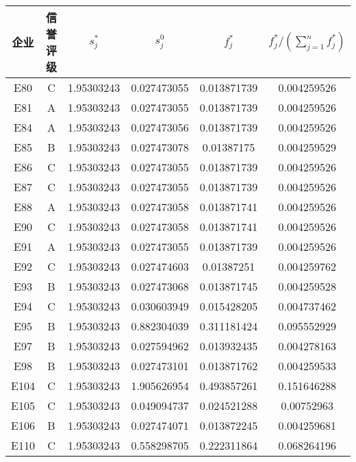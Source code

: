 \documentclass{cumcmthesis}
\begin{document}
\begin{appendices}
\begin{table}[H]   %
\centering
\begin{tabular}{cccccc}
\toprule[1.5pt]
企业& 信誉评级 & $s_j^*$ & $s_j^0$ & $f_j^*$ & $f_j^*/(\sum_{j=1}^n f_j^*)$ \\ 
\midrule[1pt]
E80 & C & 1.95303243 & 0.027473055 & 0.013871739 & 0.004259526 \\ 
E81 & A & 1.95303243 & 0.027473055 & 0.013871739 & 0.004259526 \\ 
E84 & A & 1.95303243 & 0.027473056 & 0.013871739 & 0.004259526 \\ 
E85 & B & 1.95303243 & 0.027473078 & 0.01387175 & 0.004259529 \\ 
E86 & C & 1.95303243 & 0.027473055 & 0.013871739 & 0.004259526 \\ 
E87 & C & 1.95303243 & 0.027473055 & 0.013871739 & 0.004259526 \\ 
E88 & A & 1.95303243 & 0.027473058 & 0.013871741 & 0.004259526 \\ 
E90 & C & 1.95303243 & 0.027473058 & 0.013871741 & 0.004259526 \\ 
E91 & A & 1.95303243 & 0.027473055 & 0.013871739 & 0.004259526 \\ 
E92 & C & 1.95303243 & 0.027474603 & 0.01387251 & 0.004259762 \\ 
E93 & B & 1.95303243 & 0.027473068 & 0.013871745 & 0.004259528 \\ 
E94 & C & 1.95303243 & 0.030603949 & 0.015428205 & 0.004737462 \\ 
E95 & B & 1.95303243 & 0.882304039 & 0.311181424 & 0.095552929 \\ 
E97 & B & 1.95303243 & 0.027594962 & 0.013932435 & 0.004278163 \\ 
E98 & B & 1.95303243 & 0.027473101 & 0.013871762 & 0.004259533 \\ 
E104 & C & 1.95303243 & 1.905626954 & 0.493857261 & 0.151646288 \\ 
E105 & C & 1.95303243 & 0.049094737 & 0.024521288 & 0.00752963 \\ 
E106 & B & 1.95303243 & 0.027474071 & 0.013872245 & 0.004259681 \\ 
E110 & C & 1.95303243 & 0.558298705 & 0.222311864 & 0.068264196 \\ 
		\bottomrule[1.5pt]
\end{tabular}
\end{table}



\end{appendices}
\end{document}
